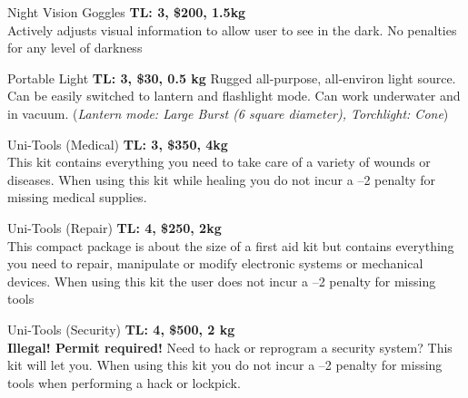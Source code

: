 \begin{genericsection}{Night Vision Goggles}
\textbf{TL: 3, \$200, 1.5kg}\\
Actively adjusts visual information to allow user to see in the dark. No penalties for any level of darkness
\end{genericsection}

\begin{genericsection}{Portable Light}
\textbf{TL: 3, \$30, 0.5 kg}
Rugged all-purpose, all-environ light source. Can be easily switched to lantern and flashlight mode. Can work underwater and in vacuum. (\textit{Lantern mode: Large Burst (6 square diameter), Torchlight: Cone})
\end{genericsection}

\begin{genericsection}{Uni-Tools (Medical)}
\textbf{TL: 3, \$350, 4kg}\\
This kit contains everything you need to take care of a variety of wounds or diseases. When using this kit while healing you do not incur a –2 penalty for missing medical supplies.
\end{genericsection}

\begin{genericsection}{Uni-Tools (Repair)}
\textbf{TL: 4, \$250, 2kg}\\
This compact package is about the size of a first aid kit but contains everything you need to repair, manipulate or modify electronic systems or mechanical devices. When using this kit the user does not incur a –2 penalty for missing tools
\end{genericsection}

\begin{genericsection}{Uni-Tools (Security)}
\textbf{TL: 4, \$500, 2 kg}\\
\textbf{Illegal! Permit required!} Need to hack or reprogram a security system? This kit will let you. When using this kit you do not incur a –2 penalty for missing tools when performing a hack or lockpick.
\end{genericsection}
